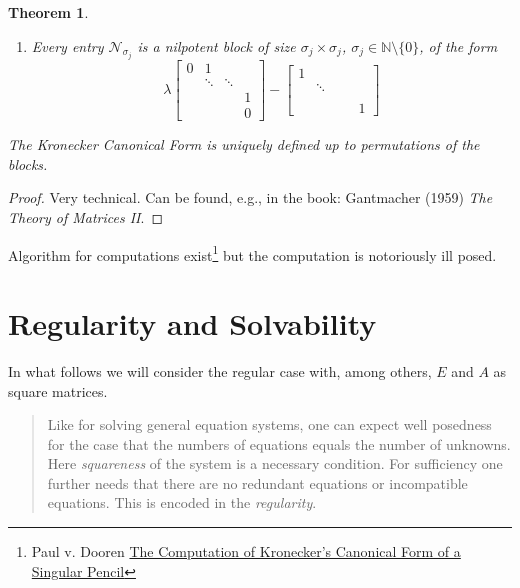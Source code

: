 \documentclass[]{book}
\newenvironment {JHSAYS} [0] {\begin{quote}\color{jhsc}} {\end{quote}}
\newtheorem{theorem}{Theorem}[chapter]
\theoremstyle{definition}
\theoremstyle{definition}
\theoremstyle{definition}
\theoremstyle{definition}
\theoremstyle{remark}
\begin{document}
\begin{theorem}
\begin{enumerate}
\begin{equation*}
\begin{bmatrix}
  &&& \lambda_j 
  \end{bmatrix}
  \end{equation*}
\item
  Every entry \(\mathcal N_{\sigma_j}\) is a nilpotent block of size \(\sigma_j\times \sigma_j\), \(\sigma_j \in \mathbb N \setminus \{0\}\), of the form
  \begin{equation*}
  \lambda 
  \begin{bmatrix}
  0 &1\\
  & \ddots & \ddots \\
  &&& 1  \\
  &&& 0 
  \end{bmatrix}
  -
  \begin{bmatrix}
  1 \\
  & \ddots  \\
  &&&  \\
  &&&& 1 
  \end{bmatrix}
  \end{equation*}
\end{enumerate}

The \emph{Kronecker Canonical Form} is uniquely defined up to permutations of the blocks.
\end{theorem}

\begin{proof}
{}Very technical. Can be found, e.g., in the book: Gantmacher (1959) \emph{The Theory of Matrices II}.
\end{proof}

Algorithm for computations exist\footnote{Paul v. Dooren \href{https://perso.uclouvain.be/paul.vandooren/publications/VDooren79.pdf}{The Computation of Kronecker's Canonical Form of a Singular Pencil}} but the computation is notoriously ill posed.

\hypertarget{regularity-and-solvability}{%
\section{Regularity and Solvability}\label{regularity-and-solvability}}

In what follows we will consider the regular case with, among others, \(E\) and \(A\) as square matrices.

\begin{JHSAYS}
Like for solving general equation systems, one can expect well posedness
for the case that the numbers of equations equals the number of
unknowns. Here \emph{squareness} of the system is a necessary condition.
For sufficiency one further needs that there are no redundant equations
or incompatible equations. This is encoded in the \emph{regularity}.
\end{JHSAYS}
\end{document}
